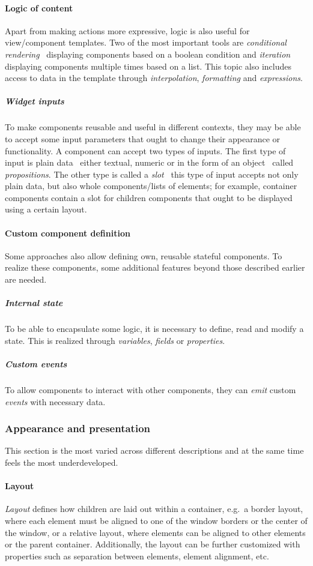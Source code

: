 \paragraph{Logic of content}
Apart from making actions more expressive, logic is also useful for view/component templates.
Two of the most important tools are \emph{conditional rendering} \textendash\ displaying components based on a boolean condition and \emph{iteration} displaying components multiple times based on a list.
This topic also includes access to data in the template through \emph{interpolation}, \emph{formatting} and \emph{expressions}.

\subparagraph{Widget inputs}
To make components reusable and useful in different contexts, they may be able to accept some input parameters that ought to change their appearance or functionality.
A component can accept two types of inputs.
The first type of input is plain data \textendash\ either textual, numeric or in the form of an object \textendash\ called \emph{propositions}.
The other type is called a \emph{slot} \textendash\ this type of input accepts not only plain data, but also whole components/lists of elements;
for example, container components contain a slot for children components that ought to be displayed using a certain layout.

\paragraph{Custom component definition}
Some approaches also allow defining own, reusable stateful components.
To realize these components, some additional features beyond those described earlier are needed.

\subparagraph{Internal state}
To be able to encapsulate some logic, it is necessary to define, read and modify a state.
This is realized through \emph{variables}, \emph{fields} or \emph{properties}.

\subparagraph{Custom events}
To allow components to interact with other components, they can \emph{emit} custom \emph{events} with necessary data.

\subsubsection{Appearance and presentation}
This section is the most varied across different descriptions and at the same time feels the most underdeveloped.

\paragraph{Layout}
\emph{Layout} defines how children are laid out within a container, e.g.\ a border layout, where each element must be aligned to one of the window borders or the center of the window, or a relative layout, where elements can be aligned to other elements or the parent container.
Additionally, the layout can be further customized with properties such as separation between elements, element alignment, etc.

